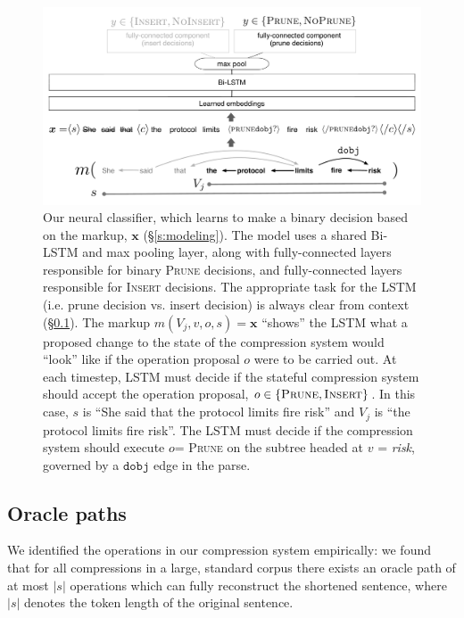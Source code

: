 \documentclass[11pt,a4paper]{article}
\begin{document}
\begin{figure}[htb!]
\centering
\includegraphics[width=.85\textwidth]{example.pdf}
\caption{Our neural classifier, which learns to make a binary decision based on the markup, $\bm{x}$ (\S\ref{s:modeling}). The model uses a shared Bi-LSTM and max pooling layer, along with fully-connected layers responsible for binary \textsc{Prune} decisions, and fully-connected layers responsible for \textsc{Insert} decisions. The appropriate task for the LSTM (i.e. prune decision vs. insert decision) is always clear from context (\S\ref{s:oracle}). The markup $m(V_j,v,o,s)=\bm{x}$ ``shows'' the LSTM what a proposed change to the state of the compression system would ``look'' like if the operation proposal $o$ were to be carried out. At each timestep, LSTM must decide if the stateful compression system should accept the operation proposal, $o \in \{\textsc{Prune}, \textsc{Insert}\}$. In this case, $s$ is ``She said that the protocol limits fire risk'' and $V_j$ is ``the protocol limits fire risk''.  The LSTM must decide if the compression system should execute $o$= \textsc{Prune} on the subtree headed at $v$ = \textit{risk}, governed by a $\texttt{dobj}$ edge in the parse. }
\label{f:example}
\end{figure}

\subsection{Oracle paths}\label{s:oracle}

We identified the operations in our compression system empirically: we found that for all compressions in a large, standard corpus \cite{filippova2013overcoming} there exists an oracle path of at most $|s|$ operations which can fully reconstruct the shortened sentence, where $|s|$ denotes the token length of the original sentence.
\end{document}
